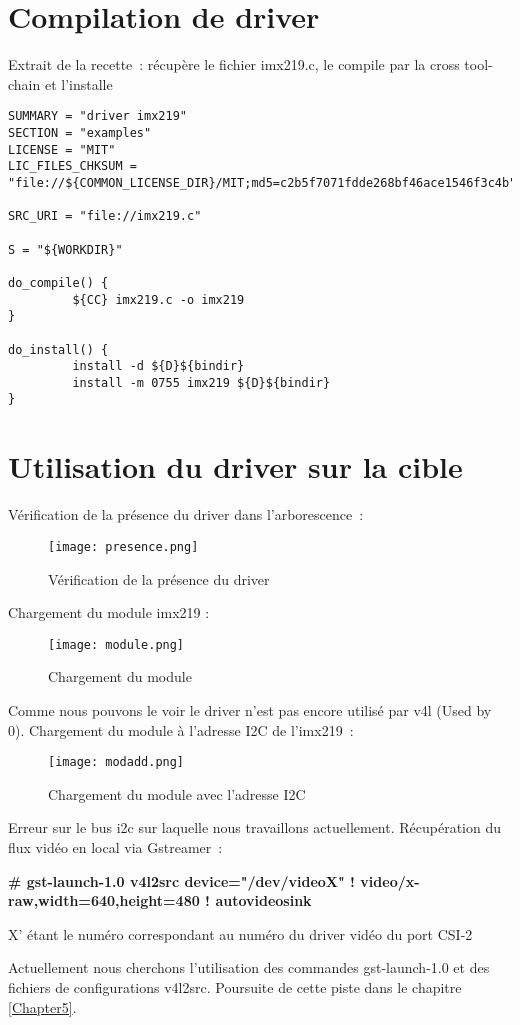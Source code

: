 \section{Compilation de driver}
Extrait de la recette : récupère le fichier imx219.c, le compile par la cross
tool-chain et l’installe

\begin{lstlisting}
SUMMARY = "driver imx219"
SECTION = "examples"
LICENSE = "MIT"
LIC_FILES_CHKSUM = "file://${COMMON_LICENSE_DIR}/MIT;md5=c2b5f7071fdde268bf46ace1546f3c4b"

SRC_URI = "file://imx219.c"

S = "${WORKDIR}"

do_compile() {
         ${CC} imx219.c -o imx219
}

do_install() {
         install -d ${D}${bindir}
         install -m 0755 imx219 ${D}${bindir}
}
\end{lstlisting}

\section{Utilisation du driver sur la cible}
Vérification de la présence du driver dans l’arborescence :

\begin{figure}[th]
    \centering
    \texttt{[image: presence.png]}
    \decoRule
    \caption{Vérification de la présence du driver}  \label{fig:pres}
\end{figure}

Chargement du module imx219 :

\begin{figure}[th]
    \centering
    \texttt{[image: module.png]}
    \decoRule
    \caption{Chargement du module}  \label{fig:mod}
\end{figure}

Comme nous pouvons le voir le driver n’est pas encore utilisé par v4l (Used by 0).
Chargement du module à l’adresse I2C de l’imx219 :

\begin{figure}[th]
    \centering
    \texttt{[image: modadd.png]}
    \decoRule
    \caption{Chargement du module avec l'adresse I2C}  \label{fig:modadd}
\end{figure}

Erreur sur le bus i2c sur laquelle nous travaillons actuellement.
Récupération du flux vidéo en local via Gstreamer :

\textbf{\# gst-launch-1.0 v4l2src device="/dev/videoX" ! video/x-raw,width=640,height=480 ! autovideosink}

X’ étant le numéro correspondant au numéro du driver vidéo du port CSI-2

Actuellement nous cherchons l’utilisation des commandes gst-launch-1.0 et des
fichiers de configurations v4l2src. Poursuite de cette piste dans le chapitre \ref{Chapter5}.

